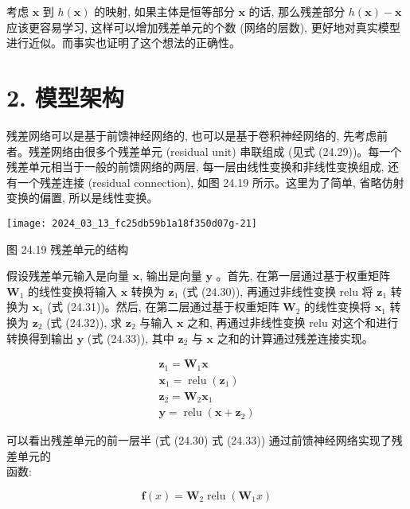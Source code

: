\documentclass[10pt]{article}
\begin{document}
考虑 $\boldsymbol{x}$ 到 $h(\boldsymbol{x})$ 的映射, 如果主体是恒等部分 $\boldsymbol{x}$ 的话, 那么残差部分 $h(\boldsymbol{x})-\boldsymbol{x}$ 应该更容易学习, 这样可以增加残差单元的个数 (网络的层数), 更好地对真实模型进行近似。而事实也证明了这个想法的正确性。

\section*{2. 模型架构}
残差网络可以是基于前馈神经网络的, 也可以是基于卷积神经网络的, 先考虑前者。残差网络由很多个残差单元 (residual unit) 串联组成 (见式 (24.29))。每一个残差单元相当于一般的前馈网络的两层, 每一层由线性变换和非线性变换组成, 还有一个残差连接 (residual connection), 如图 24.19 所示。这里为了简单, 省略仿射变换的偏置, 所以是线性变换。

\begin{center}
\texttt{[image: 2024\_03\_13\_fc25db59b1a18f350d07g-21]}
\end{center}

图 24.19 残差单元的结构

假设残差单元输入是向量 $\boldsymbol{x}$, 输出是向量 $\boldsymbol{y}$ 。首先, 在第一层通过基于权重矩阵 $\boldsymbol{W}_{1}$ 的线性变换将输入 $\boldsymbol{x}$ 转换为 $\boldsymbol{z}_{1}$ (式 (24.30)), 再通过非线性变换 relu 将 $\boldsymbol{z}_{1}$ 转换为 $\boldsymbol{x}_{1}$ (式 (24.31))。然后, 在第二层通过基于权重矩阵 $\boldsymbol{W}_{2}$ 的线性变换将 $\boldsymbol{x}_{1}$ 转换为 $\boldsymbol{z}_{2}$ (式 (24.32)), 求 $\boldsymbol{z}_{2}$ 与输入 $\boldsymbol{x}$ 之和, 再通过非线性变换 relu 对这个和进行转换得到输出 $\boldsymbol{y}$ (式 (24.33)), 其中 $\boldsymbol{z}_{2}$ 与 $\boldsymbol{x}$ 之和的计算通过残差连接实现。


\begin{gather*}
\boldsymbol{z}_{1}=\boldsymbol{W}_{1} \boldsymbol{x}  \tag{24.30}\\
\boldsymbol{x}_{1}=\operatorname{relu}\left(\boldsymbol{z}_{1}\right)  \tag{24.31}\\
\boldsymbol{z}_{2}=\boldsymbol{W}_{2} \boldsymbol{x}_{1}  \tag{24.32}\\
\boldsymbol{y}=\operatorname{relu}\left(\boldsymbol{x}+\boldsymbol{z}_{2}\right) \tag{24.33}
\end{gather*}


可以看出残差单元的前一层半 (式 (24.30) 式 (24.33)) 通过前馈神经网络实现了残差单元的\\
函数:


\begin{equation*}
\boldsymbol{f}(x)=\boldsymbol{W}_{2} \operatorname{relu}\left(\boldsymbol{W}_{1} x\right) \tag{24.34}
\end{equation*}
\end{document}
